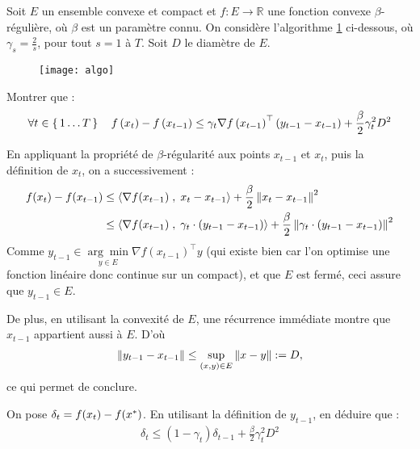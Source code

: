 \begin{exo}

Soit $E$ un ensemble convexe et compact et $f : E \rightarrow \mathbb { R }$ une fonction
 convexe  $\beta$-régulière, où $\beta$ est un paramètre connu. On considère l'algorithme
 \ref{fig:algo} ci-dessous, où $\gamma_s = \frac{2}{s}$, pour tout $s=1$ à $T$. Soit $D$ le diamètre
 de $E$.

\begin{figure}[H]
  \centering
  \texttt{[image: algo]}
  \label{fig:algo}
\end{figure}
\end{exo}

\begin{qst}

Montrer que :
\begin{align}
  \forall t \in \left \{ \, 1 \ldots T \, \right \} \quad f \left( x _ { t } \right) - f \left( x _ { t - 1 } \right) \leq \gamma _ { t } \nabla f \left( x _ { t - 1 } \right) ^ { \top } \left( y _ { t - 1 } - x _ { t - 1 } \right) +\frac { \beta } { 2 } \gamma _ { t } ^ { 2 } D ^ { 2 }
\end{align}
\end{qst}


\begin{rep}


En appliquant la propriété de $\beta$-régularité aux points $x_{t-1}$ et $x_t$, puis la définition de $x_t$, on a successivement :
\begin{align*}
  f(x_{t})-f(x_{t-1}) &\leq \ps{\grad f(x_{t-1})}{x_t-x_{t-1}}+\frac{\beta}{2}
  \norme{x_t-x_{t-1}}^2\\
  &\leq \ps{\grad f(x_{t-1})}{\gamma_t\cdot (y_{t-1}-x_{t-1})}+\frac{\beta}{2}
  \norme{\gamma_t\cdot (y_{t-1}-x_{t-1})}^2
\end{align*}
Comme $y _ { t - 1 } \in \underset { y \in E } { \arg \min } \nabla f \left( x _ { t - 1 } \right) ^ { \top } y$ (qui existe bien car l'on optimise une fonction linéaire
 donc continue sur un compact), et que $E$ est fermé, ceci assure que $y_{t-1}\in E$.

 De plus, en utilisant la convexité de $E$, une récurrence immédiate montre que $x_{t-1}$
 appartient aussi à $E$.
 D'où
 \begin{align*}
\norme{y_{t-1}-x_{t-1}} \leq \sup_{(x,y)\in E} \norme{x-y} := D,
 \end{align*}
ce qui permet de conclure.
\end{rep}

\begin{qst}

On pose $\delta_t = f(x_t)-f(x^{*})$. En utilisant la définition de $y_{t-1}$, en
déduire que :
\begin{align} \label{eq:tele}
\delta _ { t } \leq \left( 1 - \gamma _ { t } \right) \delta _ { t - 1 } + \frac { \beta } { 2 } \gamma _ { t } ^ { 2 } D ^ { 2 }
\end{align}
\end{qst}

